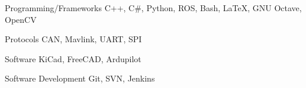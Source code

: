 

\begin{cvskills}

  \cvskill
    {Programming/Frameworks} %
    {C++, C\#, Python, ROS, Bash, LaTeX, GNU Octave, OpenCV} %

  \cvskill
    {Protocols} %
    {CAN, Mavlink, UART, SPI} %

  \cvskill
    {Software} %
    {KiCad, FreeCAD, Ardupilot} %

  \cvskill
    {Software Development} %
    {Git, SVN, Jenkins} %

\end{cvskills}
